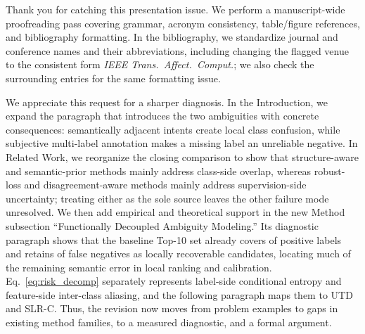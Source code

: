 
{Thank you for catching this presentation issue. We perform a manuscript-wide proofreading pass covering grammar, acronym consistency, table/figure references, and bibliography formatting. In the bibliography, we standardize journal and conference names and their abbreviations, including changing the flagged venue to the consistent form \emph{IEEE Trans.\ Affect.\ Comput.}; we also check the surrounding entries for the same formatting issue.
}

{We appreciate this request for a sharper diagnosis. In the Introduction, we expand the paragraph that introduces the two ambiguities with concrete consequences: semantically adjacent intents create local class confusion, while subjective multi-label annotation makes a missing label an unreliable negative. In Related Work, we reorganize the closing comparison to show that structure-aware and semantic-prior methods mainly address class-side overlap, whereas robust-loss and disagreement-aware methods mainly address supervision-side uncertainty; treating either as the sole source leaves the other failure mode unresolved. We then add empirical and theoretical support in the new Method subsection ``Functionally Decoupled Ambiguity Modeling.'' Its diagnostic paragraph shows that the baseline Top-10 set already covers  of positive labels and retains  of false negatives as locally recoverable candidates, locating much of the remaining semantic error in local ranking and calibration. Eq.~\eqref{eq:risk_decomp} separately represents label-side conditional entropy and feature-side inter-class aliasing, and the following paragraph maps them to UTD and SLR-C. Thus, the revision now moves from problem examples to gaps in existing method families, to a measured diagnostic, and a formal argument.
}

